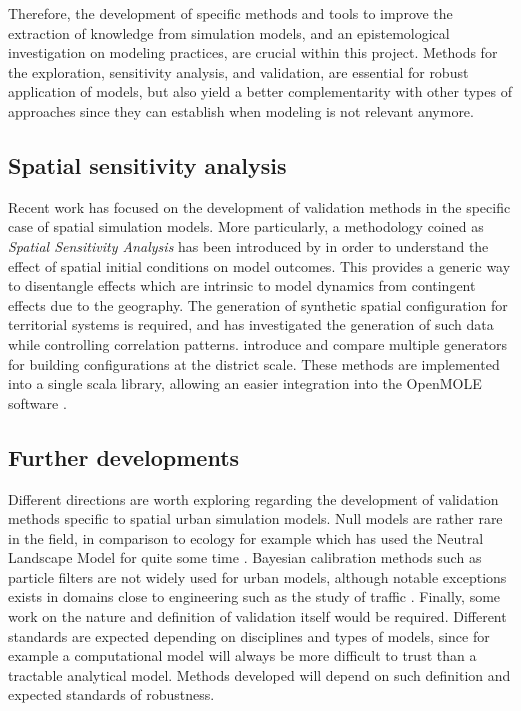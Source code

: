 Therefore, the development of specific methods and tools to improve the extraction of knowledge from simulation models, and an epistemological investigation on modeling practices, are crucial within this project. Methods for the exploration, sensitivity analysis, and validation, are essential for robust application of models, but also yield a better complementarity with other types of approaches since they can establish when modeling is not relevant anymore.


\subsection{Spatial sensitivity analysis}

Recent work has focused on the development of validation methods in the specific case of spatial simulation models. More particularly, a methodology coined as \emph{Spatial Sensitivity Analysis} has been introduced by \cite{raimbault2019space} in order to understand the effect of spatial initial conditions on model outcomes. This provides a generic way to disentangle effects which are intrinsic to model dynamics from contingent effects due to the geography. The generation of synthetic spatial configuration for territorial systems is required, and \cite{raimbault2019second} has investigated the generation of such data while controlling correlation patterns. \cite{raimbault2019generating} introduce and compare multiple generators for building configurations at the district scale. These methods are implemented into a single scala library, allowing an easier integration into the OpenMOLE software \cite{raimbault2020scala}.


\subsection{Further developments}

Different directions are worth exploring regarding the development of validation methods specific to spatial urban simulation models. Null models are rather rare in the field, in comparison to ecology for example which has used the Neutral Landscape Model for quite some time \cite{with1997use}. Bayesian calibration methods such as particle filters \cite{jiang2017new} are not widely used for urban models, although notable exceptions exists in domains close to engineering such as the study of traffic \cite{marinica2011particle}. Finally, some work on the nature and definition of validation itself would be required. Different standards are expected depending on disciplines and types of models, since for example a computational model will always be more difficult to trust than a tractable analytical model. Methods developed will depend on such definition and expected standards of robustness.



